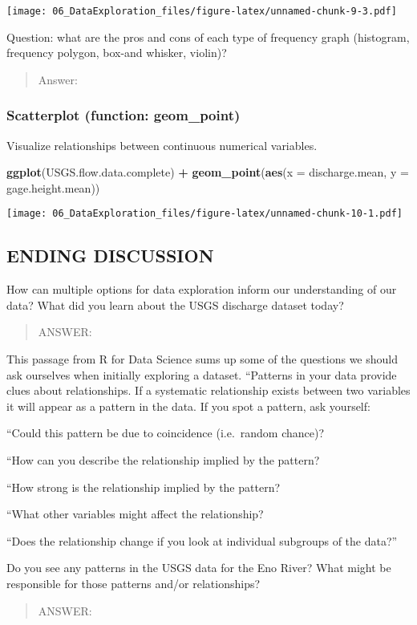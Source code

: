 \documentclass[]{article}
\newenvironment{Shaded}{\begin{snugshade}}{\end{snugshade}}
\newcommand{\KeywordTok}[1]{\textcolor[rgb]{0.13,0.29,0.53}{\textbf{#1}}}
\newcommand{\DataTypeTok}[1]{\textcolor[rgb]{0.13,0.29,0.53}{#1}}
\newcommand{\StringTok}[1]{\textcolor[rgb]{0.31,0.60,0.02}{#1}}
\newcommand{\OperatorTok}[1]{\textcolor[rgb]{0.81,0.36,0.00}{\textbf{#1}}}
\newcommand{\NormalTok}[1]{#1}
\begin{document}
\texttt{[image: 06\_DataExploration\_files/figure-latex/unnamed-chunk-9-3.pdf]}

Question: what are the pros and cons of each type of frequency graph
(histogram, frequency polygon, box-and whisker, violin)?

\begin{quote}
Answer:
\end{quote}

\subsubsection{Scatterplot (function:
geom\_point)}\label{scatterplot-function-geom_point}

Visualize relationships between continuous numerical variables.

\begin{Shaded}
\begin{Highlighting}[]
\KeywordTok{ggplot}\NormalTok{(USGS.flow.data.complete) }\OperatorTok{+}
\StringTok{  }\KeywordTok{geom_point}\NormalTok{(}\KeywordTok{aes}\NormalTok{(}\DataTypeTok{x =}\NormalTok{ discharge.mean, }\DataTypeTok{y =}\NormalTok{ gage.height.mean))}
\end{Highlighting}
\end{Shaded}

\texttt{[image: 06\_DataExploration\_files/figure-latex/unnamed-chunk-10-1.pdf]}

\subsection{ENDING DISCUSSION}\label{ending-discussion}

How can multiple options for data exploration inform our understanding
of our data? What did you learn about the USGS discharge dataset today?

\begin{quote}
ANSWER:
\end{quote}

This passage from R for Data Science sums up some of the questions we
should ask ourselves when initially exploring a dataset. ``Patterns in
your data provide clues about relationships. If a systematic
relationship exists between two variables it will appear as a pattern in
the data. If you spot a pattern, ask yourself:

``Could this pattern be due to coincidence (i.e.~random chance)?

``How can you describe the relationship implied by the pattern?

``How strong is the relationship implied by the pattern?

``What other variables might affect the relationship?

``Does the relationship change if you look at individual subgroups of
the data?''

Do you see any patterns in the USGS data for the Eno River? What might
be responsible for those patterns and/or relationships?

\begin{quote}
ANSWER:
\end{quote}
\end{document}
